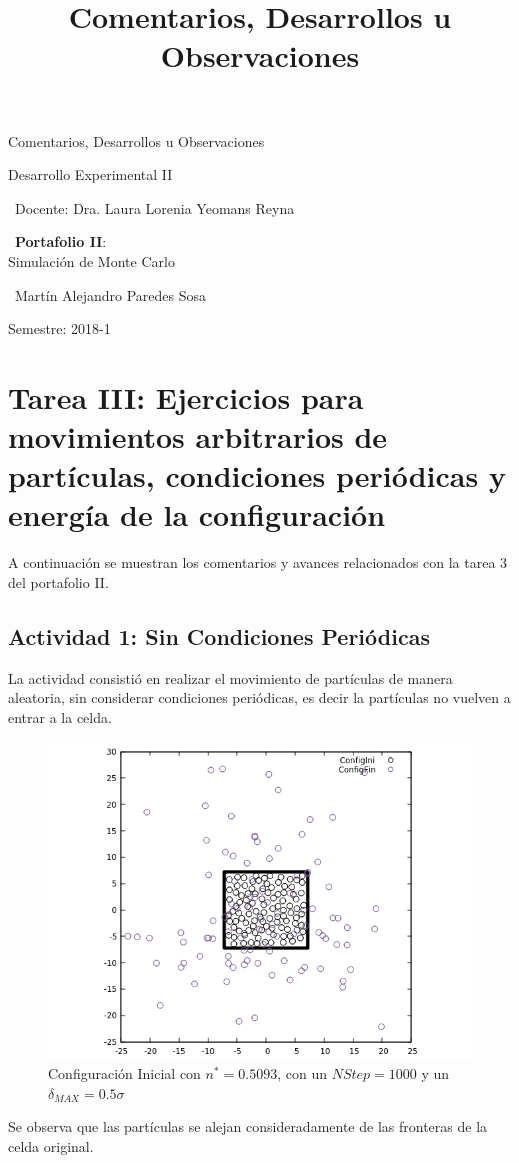 \documentclass[12pt,letterpaper]{article}
\title{ Comentarios, Desarrollos u Observaciones  }
\begin{document}
\begin{titlepage}
	\centering
    \vspace*{2cm}
	{\Huge Comentarios, Desarrollos u Observaciones \par}
	\vfill
	{\Large Desarrollo Experimental II \par}
	\vfill
	{\large\ Docente: Dra. Laura Lorenia Yeomans Reyna \par}
    \vfill
    {\large\ \textbf{Portafolio II}:\\ Simulación de Monte Carlo \par}
    \vfill
    {\large\ Martín Alejandro Paredes Sosa \par}
	\vfill
	{\large Semestre: 2018-1\par}
\end{titlepage}
\section*{Tarea III: Ejercicios para movimientos arbitrarios de partículas, condiciones periódicas y energía de la configuración }
A continuación se muestran los comentarios y avances relacionados con la tarea 3 del portafolio II.
\vspace{-0.5cm}

\subsection*{Actividad 1: Sin Condiciones Periódicas}
La actividad consistió en realizar el movimiento de partículas de manera aleatoria, sin considerar condiciones periódicas, es decir la partículas no vuelven a entrar a la celda. 
	\begin{figure}[H]
		\centering

		\includegraphics[scale=0.75]{Config_INI_FIN_2.png}
		\caption{Configuración Inicial con $n^*=0.5093$, con un $NStep=1000$ y un $\delta_{MAX}=0.5\sigma$}
	\end{figure}
	Se observa que las partículas se alejan consideradamente de las fronteras de la celda original.
\end{document}
